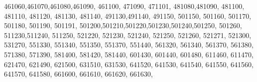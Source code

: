 \textquotesingle{}461060\textquotesingle{},\textquotesingle{}461070\textquotesingle{},\textquotesingle{}461080\textquotesingle{},\textquotesingle{}461090\textquotesingle{}, \textquotesingle{}461100\textquotesingle{}, \textquotesingle{}471090\textquotesingle{}, \textquotesingle{}471101\textquotesingle{}, \textquotesingle{}481080\textquotesingle{},\textquotesingle{}481090\textquotesingle{}, \textquotesingle{}481100\textquotesingle{}, \textquotesingle{}481110\textquotesingle{}, \textquotesingle{}481120\textquotesingle{}, \textquotesingle{}481130\textquotesingle{}, \textquotesingle{}481140\textquotesingle{}, \textquotesingle{}491130\textquotesingle{},\textquotesingle{}491140\textquotesingle{}, \textquotesingle{}491150\textquotesingle{}, \textquotesingle{}501150\textquotesingle{}, \textquotesingle{}501160\textquotesingle{}, \textquotesingle{}501170\textquotesingle{}, \textquotesingle{}501180\textquotesingle{}, \textquotesingle{}501190\textquotesingle{}, \textquotesingle{}501191\textquotesingle{}, \textquotesingle{}501200\textquotesingle{},\textquotesingle{}501210\textquotesingle{},\textquotesingle{}501220\textquotesingle{},\textquotesingle{}501230\textquotesingle{},\textquotesingle{}501240\textquotesingle{},\textquotesingle{}501250\textquotesingle{}, \textquotesingle{}501260\textquotesingle{}, \textquotesingle{}511230\textquotesingle{},\textquotesingle{}511240\textquotesingle{}, \textquotesingle{}511250\textquotesingle{}, \textquotesingle{}521220\textquotesingle{}, \textquotesingle{}521230\textquotesingle{}, \textquotesingle{}521240\textquotesingle{}, \textquotesingle{}521250\textquotesingle{}, \textquotesingle{}521260\textquotesingle{}, \textquotesingle{}521271\textquotesingle{}, \textquotesingle{}521300\textquotesingle{}, \textquotesingle{}531270\textquotesingle{}, \textquotesingle{}551330\textquotesingle{}, \textquotesingle{}551340\textquotesingle{}, \textquotesingle{}551350\textquotesingle{}, \textquotesingle{}551370\textquotesingle{}, \textquotesingle{}551440\textquotesingle{}, \textquotesingle{}561320\textquotesingle{}, \textquotesingle{}561340\textquotesingle{}, \textquotesingle{}561370\textquotesingle{}, \textquotesingle{}561380\textquotesingle{}, \textquotesingle{}571380\textquotesingle{}, \textquotesingle{}571390\textquotesingle{}, \textquotesingle{}581400\textquotesingle{}, \textquotesingle{}581420\textquotesingle{}, \textquotesingle{}581440\textquotesingle{}, \textquotesingle{}601430\textquotesingle{}, \textquotesingle{}601440\textquotesingle{}, \textquotesingle{}601480\textquotesingle{}, \textquotesingle{}611460\textquotesingle{}, \textquotesingle{}611470\textquotesingle{}, \textquotesingle{}621470\textquotesingle{}, \textquotesingle{}621490\textquotesingle{}, \textquotesingle{}621500\textquotesingle{}, \textquotesingle{}631510\textquotesingle{}, \textquotesingle{}631530\textquotesingle{}, \textquotesingle{}641520\textquotesingle{}, \textquotesingle{}641530\textquotesingle{}, \textquotesingle{}641540\textquotesingle{}, \textquotesingle{}641550\textquotesingle{}, \textquotesingle{}641560\textquotesingle{}, \textquotesingle{}641570\textquotesingle{}, \textquotesingle{}641580\textquotesingle{}, \textquotesingle{}661600\textquotesingle{}, \textquotesingle{}661610\textquotesingle{}, \textquotesingle{}661620\textquotesingle{}, \textquotesingle{}661630\textquotesingle{}, 